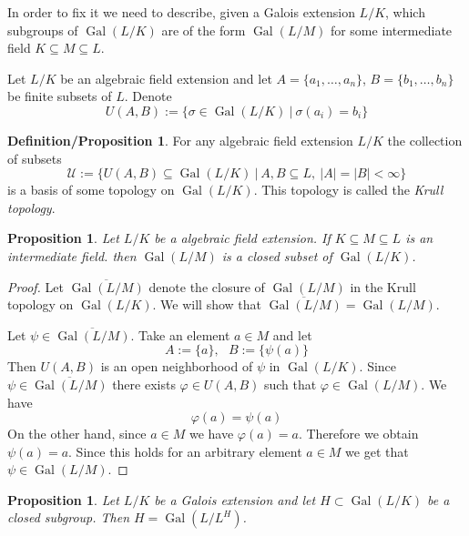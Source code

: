 \documentclass[12pt, letterpaper, oneside]{article}
\theoremstyle{plain}
\newtheorem{proposition}[theorem]{Proposition}
\theoremstyle{definition}
\newtheorem{definition/proposition}[theorem]{Definition/Proposition}
\newcommand{\Gal}{\operatorname{Gal}}
\newcommand{\vs}{\vskip 5mm}
\begin{document}
\vs

In order to fix it we need to describe, given a Galois extension $L/K$,  which subgroups of 
$\Gal(L/K)$ are of the form $\Gal(L/M)$ for some intermediate field $K\subseteq M\subseteq L$. 

\vs\vs


Let $L/K$ be an algebraic field extension and let $A=\{ a_{1}, \dots, a_{n}\}$, $B=\{b_{1}, \dots, b_{n}\}$ be 
finite subsets of $L$. Denote
$$U(A, B) := \{\sigma\in \Gal(L/K) \ | \ \sigma(a_{i}) = b_{i} \}$$ 

\vs

\begin{definition/proposition}
For any algebraic field extension $L/K$ the collection of subsets 
$$\mathcal{U} := \{ U(A, B) \subseteq \Gal(L/K) \ | \ A, B \subseteq L, \ |A| = |B| < \infty \}$$
is a basis of some topology on $\Gal(L/K)$. This topology is called the \emph{Krull topology}. 
\end{definition/proposition}

\vs\vs

\begin{proposition}
Let $L/K$ be a algebraic field extension. If $K\subseteq M\subseteq L$ is an intermediate field. 
then $\Gal(L/M)$ is a closed subset of $\Gal(L/K)$.
\end{proposition}

\vs

\begin{proof}
Let $\overline{\Gal(L/M)}$ denote the closure of $\Gal(L/M)$ in the Krull topology on $\Gal(L/K)$. 
We will show that $\overline{\Gal(L/M)} = \Gal(L/M)$. 

Let $\psi\in \overline{\Gal(L/M)}$. Take an element $a\in M$ and let 
$$A:=\{a\}, \ \ \  B:= \{\psi(a) \}$$
Then $U(A, B)$ is an open neighborhood of $\psi$ in $\Gal(L/K)$. Since 
$\psi\in  \overline{\Gal(L/M)}$ there exists $\varphi\in U(A, B)$ such that $\varphi\in \Gal(L/M)$.
We have 
$$\varphi(a) = \psi(a)$$
On the other hand, since $a\in M$ we have $\varphi(a) = a$. Therefore we obtain 
$\psi(a) = a$.  Since this holds for an arbitrary element $a\in M$ we get that $\psi\in \Gal(L/M)$. 

\end{proof}


\vs\vs\vs\vs

\begin{proposition}
Let $L/K$ be a Galois extension and let $H\subset \Gal(L/K)$ be a closed subgroup. Then 
$H = \Gal(L/L^{H})$.
\end{proposition}
\end{document}
